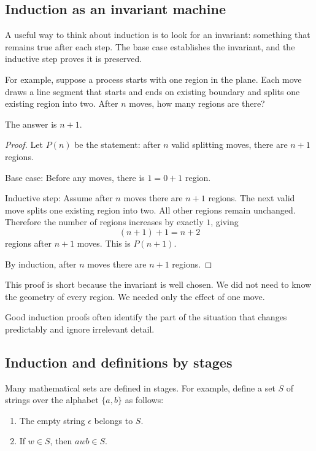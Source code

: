 \subsection{Induction as an invariant machine}

A useful way to think about induction is to look for an invariant: something that remains true after each step. The base case establishes the invariant, and the inductive step proves it is preserved.

For example, suppose a process starts with one region in the plane. Each move draws a line segment that starts and ends on existing boundary and splits one existing region into two. After $n$ moves, how many regions are there?

The answer is $n+1$.

\begin{proof}
Let $P(n)$ be the statement: after $n$ valid splitting moves, there are $n+1$ regions.

Base case: Before any moves, there is $1=0+1$ region.

Inductive step: Assume after $n$ moves there are $n+1$ regions. The next valid move splits one existing region into two. All other regions remain unchanged. Therefore the number of regions increases by exactly $1$, giving
\[
(n+1)+1=n+2
\]
regions after $n+1$ moves. This is $P(n+1)$.

By induction, after $n$ moves there are $n+1$ regions.
\end{proof}

This proof is short because the invariant is well chosen. We did not need to know the geometry of every region. We needed only the effect of one move.

\begin{intuitionbox}
Good induction proofs often identify the part of the situation that changes predictably and ignore irrelevant detail.
\end{intuitionbox}

\subsection{Induction and definitions by stages}

Many mathematical sets are defined in stages. For example, define a set $S$ of strings over the alphabet $\{a,b\}$ as follows:

\begin{enumerate}
\item The empty string $\epsilon$ belongs to $S$.
\item If $w\in S$, then $awb\in S$.
\end{enumerate}

